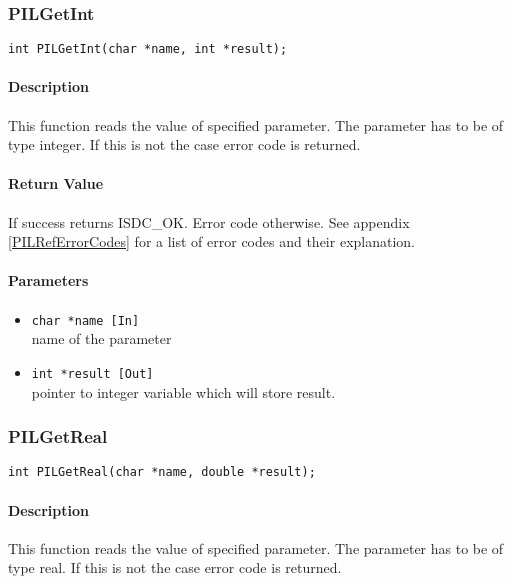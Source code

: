 
\subsubsection{PILGetInt}

\begin{verbatim}
int PILGetInt(char *name, int *result); 
\end{verbatim}

\paragraph{Description\\}
This function reads the value of specified parameter. The parameter has to
be of type
integer. If this is not the case error code is returned. 


\paragraph{Return Value\\}
If success returns ISDC\_OK. Error code otherwise. See appendix \ref{PILRefErrorCodes}
for a list of error codes and their explanation.

\paragraph{Parameters}
\begin{itemize}
\item
{\tt char *name [In]} \\
name of the parameter 
\item
{\tt int *result [Out]} \\
pointer to integer variable which will store result.

\end{itemize}



\subsubsection{PILGetReal}

\begin{verbatim}
int PILGetReal(char *name, double *result); 
\end{verbatim}

\paragraph{Description\\}
This function reads the value of specified parameter. The parameter has to
be of type real. If this is not the case
error code is returned.

